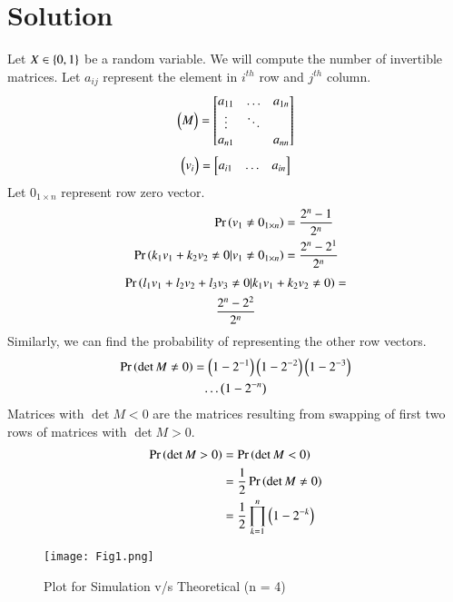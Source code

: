 \documentclass[journal,12pt,twocolumn]{IEEEtran}
\begin{document}
\section*{Solution}
Let $X \in \left\{0,1\right\}$ be a random variable. We will compute the number of invertible matrices. Let $a_{ij}$ represent the element in $i^{th}$ row and $j^{th}$ column.
\begin{align}
    \begin{pmatrix}M\end{pmatrix}=
    \begin{bmatrix}
    a_{11} & \dots & a_{1n} \\
    \vdots & \ddots & \\
    a_{n1} &        & a_{nn} 
    \end{bmatrix}
\end{align}
\begin{align}
    \begin{pmatrix}v_i\end{pmatrix} = 
    \begin{bmatrix}
    a_{i1} & \dots &a_{in}
    \end{bmatrix}
\end{align}
Let $0_{1 \times n}$ represent row zero vector.
\begin{align}
    \Pr\left(v_1 \neq 0_{1 \times n}\right) &= \frac{2^n - 1}{2^n}\\
    \Pr\left(k_1v_1 + k_2v_2 \neq 0 | v_1 \neq 0_{1 \times n}\right) &= \frac{2^n - 2^1}{2^n}
\end{align}
\begin{multline}
    \Pr\left(l_1v_1 + l_2v_2 + l_3v_3 \neq 0 | k_1v_1 + k_2v_2 \neq 0\right) =\\ \frac{2^n - 2^2}{2^n}
\end{multline}
Similarly, we can find the probability of representing the other row vectors.
\begin{multline}
    \Pr\left(\det{M} \neq 0\right) = \left(1 - 2^{-1}\right)\left(1 - 2^{-2}\right)\left(1 - 2^{-3}\right)\\ \dots \left(1 - 2^{-n}\right)
\end{multline}
Matrices with $\det{M} < 0$ are the matrices resulting from swapping of first two rows of matrices with $\det{M} > 0$.
\begin{align}
    \Pr\left(\det{M} > 0\right) &= \Pr\left(\det{M} < 0\right)\\
    &= \frac{1}{2}\Pr\left(\det{M} \neq 0\right)\\
    &= \frac{1}{2}\prod_{k = 1}^{n}\left(1 - 2^{-k}\right)
\end{align}
\begin{figure}[h]
    \centering
    \texttt{[image: Fig1.png]}
    \caption{Plot for Simulation v/s Theoretical (n = 4)}
    \label{fig:plot}
\end{figure}
\end{document}
